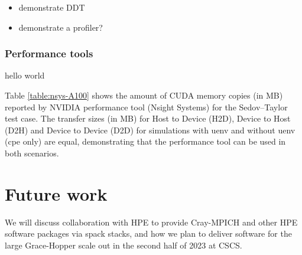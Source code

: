 
\begin{itemize}
    \item demonstrate DDT
    \item demonstrate a profiler?
\end{itemize}

\subsubsection{Performance tools}

\begin{table}[htp!]
    \centering
    \caption{hello world}
    \label{table:nsys-A100}
\end{table}

Table \ref{table:nsys-A100} shows the amount of CUDA memory copies (in MB) reported by NVIDIA performance tool (Nsight Systems) for the Sedov--Taylor test case.
The transfer sizes (in MB) for Host to Device (H2D), Device to Host (D2H) and Device to Device (D2D) for simulations with uenv and without uenv (cpe only) are equal, demonstrating that the performance tool can be used in both scenarios.

\section{Future work}

We will discuss collaboration with HPE to provide Cray-MPICH and other HPE software packages via spack stacks, and how we plan to deliver software for the large Grace-Hopper scale out in the second half of 2023 at CSCS.

